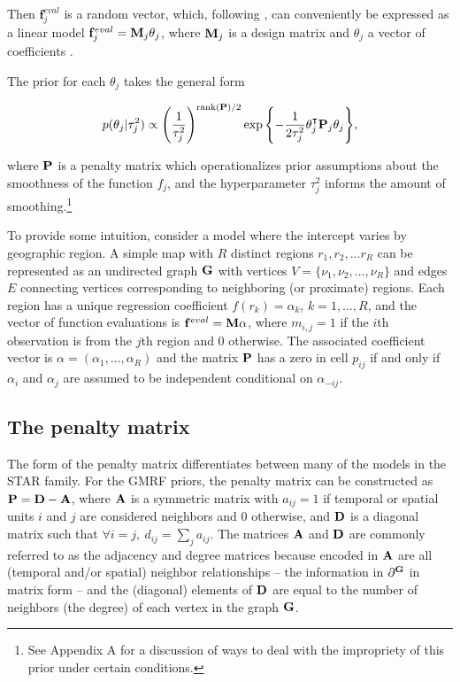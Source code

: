 \noindent Then $\mathbf{f}_j^{eval}$ is a random vector, which, following 
, can conveniently be expressed as a linear model 
$\mathbf{f}_j^{eval} = \mathbf{M}_j \theta_j$, where $\mathbf{M}_j$ is a design matrix and 
$\theta_j$ a vector of coefficients . 

The prior for each $\theta_j$  takes the general form

\begin{equation*}
p(\theta_j | \tau^2_j) 
\propto 
\left(\frac{1}{\tau_j^2} \right)^{{\rm rank}(\mathbf{P})/2}
\exp{\left\{-\frac{1}{2\tau^2_j} \theta_j^\intercal \mathbf{P}_j \theta_j\right\}},
\end{equation*}

\noindent where $\mathbf{P}$ is a penalty matrix which operationalizes prior assumptions 
about the smoothness of the function $f_j$, and the hyperparameter $\tau^2_j$
informs the amount of smoothing.\footnote{See Appendix A %
for a discussion of ways to deal with the impropriety of this prior under certain conditions.}

To provide some intuition, consider a model where the intercept varies by geographic region. 
A simple map with $R$ distinct regions $r_1, r_2, \dots r_R$ can be represented as an undirected graph 
$\mathbf{G}$ with vertices $V = \{\nu_1, \nu_2, \dots, \nu_R\}$ and edges $E$ connecting vertices corresponding 
to neighboring (or proximate) regions. Each region has a unique regression coefficient $f(r_k) = \alpha_k$,
$k = 1, \dots, R$, and the vector of function evaluations is $\mathbf{f}^{eval} = \mathbf{M} \alpha$,
where $m_{i,j} = 1$ if the $i$th observation is from the $j$th region and 0 otherwise. The associated 
coefficient vector is $\alpha = (\alpha_1, \dots, \alpha_R)$ and the matrix $\mathbf{P}$ has a zero in  
cell $p_{ij}$ if and only if $\alpha_i$ and $\alpha_j$ are assumed to be independent conditional on 
$\alpha_{-ij}$. 

\subsection{The penalty matrix} 
\label{penalty_matrix}

The form of the penalty matrix differentiates between many of the models in the STAR family. 
For the GMRF priors, the penalty matrix can be constructed as $\mathbf{P} = \mathbf{D} - \mathbf{A}$, 
where $\mathbf{A}$ is a symmetric matrix with $a_{ij} = 1$ if temporal or spatial units $i$ and $j$ 
are considered neighbors and 0 otherwise, and $\mathbf{D}$ is a diagonal matrix such that 
$\forall i = j, \: d_{ij} = \sum_j a_{ij}$. The matrices $\mathbf{A}$ and $\mathbf{D}$ are 
commonly referred to as the adjacency and degree matrices because encoded in 
$\mathbf{A}$ are all (temporal and/or spatial) neighbor relationships -- the information 
in $\partial^{\mathbf{G}}$ in matrix form -- and the (diagonal) elements of $\mathbf{D}$ 
are equal to the number of neighbors (the degree) of each vertex in the 
graph $\mathbf{G}$. 

